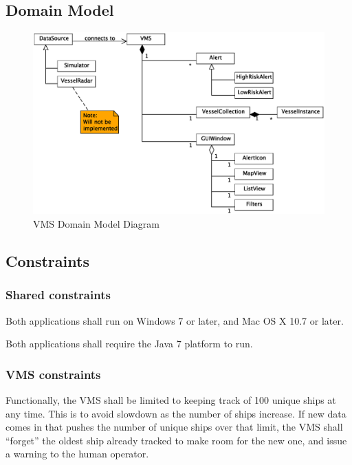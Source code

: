\documentclass{article}
\begin{document}


\subsection{Domain Model} %

\begin{figure}[h]
\caption{VMS Domain Model Diagram}
\includegraphics[width=\linewidth]{domain-model.eps}
\end{figure}

\subsection{Constraints} %

\subsubsection{Shared constraints}
Both applications shall run on Windows 7 or later, and Mac OS X 10.7 or later.

Both applications shall require the Java 7 platform to run.

\subsubsection{VMS constraints}
Functionally, the VMS shall be limited to keeping track of 100 unique ships at any time. This is to avoid slowdown as the number of ships increase. If new data comes in that pushes the number of unique ships over that limit, the VMS shall ``forget'' the oldest ship already tracked to make room for the new one, and issue a warning to the human operator.
\end{document}
